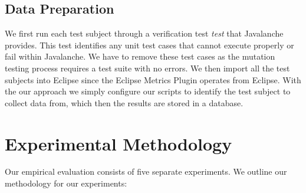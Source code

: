 \subsection{Data Preparation}
\label{subsec:experiment_data_preparation}
We first run each test subject through a verification test \emph{test} that Javalanche provides. This test identifies any unit test cases that cannot execute properly or fail within Javalanche. We have to remove these test cases as the mutation testing process requires a test suite with no errors. We then import all the test subjects into Eclipse since the Eclipse Metrics Plugin operates from Eclipse. With the our approach we simply configure our scripts to identify the test subject to collect data from, which then the results are stored in a database.


\section{Experimental Methodology}
\label{sec:experiment_methodology}
Our empirical evaluation consists of five separate experiments. We outline our methodology for our experiments:

